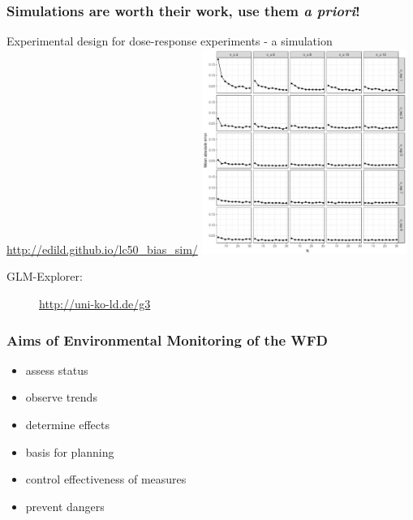 \documentclass[
	12pt
	]{beamer}
\begin{document}
\begin{frame}
\frametitle{Simulations are worth their work, use them \emph{a priori}!}
\begingroup
\footnotesize %
	Experimental design for dose-response experiments - a simulation \\
	\url{http://edild.github.io/lc50_bias_sim/}
		    	\includegraphics[width=0.5\textwidth, keepaspectratio]{figs/sim_drm.png} \\
	\begin{description}
		\item[GLM-Explorer:]{\url{http://uni-ko-ld.de/g3}}
	\end{description}
\endgroup
\end{frame}


{
\begin{frame}
\frametitle{Aims of Environmental Monitoring of the WFD}
	\begin{itemize}
			\item assess \alert{status}
			\item observe \alert{trends}
			\item determine \alert{effects}
			\item basis for \alert{planning}
			\item control \alert{effectiveness} of measures
			\item prevent \alert{dangers}
	\end{itemize}
\end{frame}
}
\end{document}
